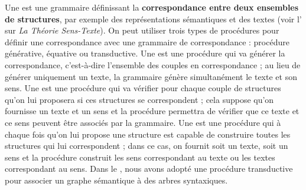 {    Une  est une grammaire définissant la \textbf{correspondance entre deux ensembles de structures}, par exemple des représentations sémantiques et des textes (voir l’ sur \textit{La Théorie Sens-Texte}). On peut utiliser trois types de procédures pour définir une correspondance avec une grammaire de correspondance : procédure générative, équative ou transductive. Une  est une procédure qui va générer la correspondance, c’est-à-dire l’ensemble des couples en correspondance ; au lieu de générer uniquement un texte, la grammaire génère simultanément le texte et son sens. Une  est une procédure qui va vérifier pour chaque couple de structures qu’on lui proposera si ces structures se correspondent ; cela suppose qu’on fournisse un texte et un sens et la procédure permettra de vérifier que ce texte et ce sens peuvent être associés par la grammaire. Une  est une procédure qui à chaque fois qu’on lui propose une structure est capable de construire toutes les structures qui lui correspondent ; dans ce cas, on fournit soit un texte, soit un sens et la procédure construit les sens correspondant au texte ou les textes correspondant au sens. Dans le , nous avons adopté une procédure transductive pour associer un graphe sémantique à des arbres syntaxiques.

}
